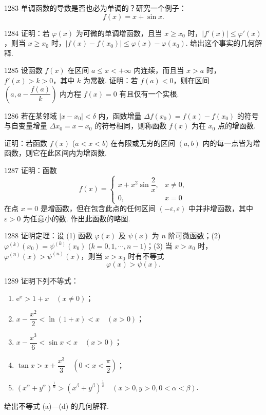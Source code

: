 \begin{prob}[M]{1283}
单调函数的导数是否也必为单调的？研究一个例子：
\[
f(x) = x + \sin x.
\]
\end{prob}

\begin{prob}[M]{1284}
证明：若 $\varphi(x)$ 为可微的单调增函数，且当 $x \geqslant x_0$ 时，$|f'(x)| \leqslant \varphi'(x)$，则当 $x \geqslant x_0$ 时，$|f(x) - f(x_0)| \leqslant \varphi(x) - \varphi(x_0)$.
给出这个事实的几何解释.
\end{prob}

\begin{prob}[M]{1285}
设函数 $f(x)$ 在区间 $a \leqslant x < +\infty$ 内连续，而且当 $x > a$ 时，$f'(x) > k > 0$，其中 $k$ 为常数. 证明：若 $f(a) < 0$，则在区间 $\left(a, a - \dfrac{f(a)}{k}\right)$ 内方程 $f(x) = 0$ 有且仅有一个实根.
\end{prob}

\begin{prob}[M]{1286}
若在某邻域 $|x - x_0| < \delta$ 内，函数增量 $\Delta f(x_0) = f(x) - f(x_0)$ 的符号与自变量增量 $\Delta x_0 = x - x_0$ 的符号相同，则称函数 $f(x)$ 为在 $x_0$ 点的增函数.

证明：若函数 $f(x)$ ($a < x < b$) 在有限或无穷的区间 $(a, b)$ 内的每一点皆为增函数，则它在此区间内为增函数.
\end{prob}

\begin{prob}[M]{1287}
证明：函数
\[
f(x) = \begin{cases}
x + x^2 \sin\dfrac{2}{x}, & x \neq 0, \\
0, & x = 0
\end{cases}
\]
在点 $x = 0$ 是增函数，但在包含此点的任何区间 $(-\varepsilon, \varepsilon)$ 中并非增函数，其中 $\varepsilon > 0$ 为任意小的数. 作出此函数的略图.
\end{prob}

\begin{prob}[M]{1288}
证明定理：设 (1) 函数 $\varphi(x)$ 及 $\psi(x)$ 为 $n$ 阶可微函数；(2) $\varphi^{(k)}(x_0) = \psi^{(k)}(x_0)$ ($k = 0, 1, \cdots, n - 1$)；(3) 当 $x > x_0$ 时，$\varphi^{(n)}(x) > \psi^{(n)}(x)$，则当 $x > x_0$ 时有不等式
\[
\varphi(x) > \psi(x).
\]
\end{prob}

\begin{prob}[L]{1289}
证明下列不等式：
\begin{enumerate}[label=(\alph*), itemsep=2pt, topsep=3pt]
\item $\mathrm{e}^x > 1 + x \quad (x \neq 0)$；
\item $x - \dfrac{x^2}{2} < \ln(1 + x) < x \quad (x > 0)$；
\item $x - \dfrac{x^3}{6} < \sin x < x \quad (x > 0)$；
\item $\tan x > x + \dfrac{x^3}{3} \quad \left(0 < x < \dfrac{\pi}{2}\right)$；
\item $(x^\alpha + y^\alpha)^{\frac{1}{\alpha}} > (x^\beta + y^\beta)^{\frac{1}{\beta}} \quad (x > 0, y > 0, 0 < \alpha < \beta)$.
\end{enumerate}
给出不等式 (a)---(d) 的几何解释.
\end{prob}


